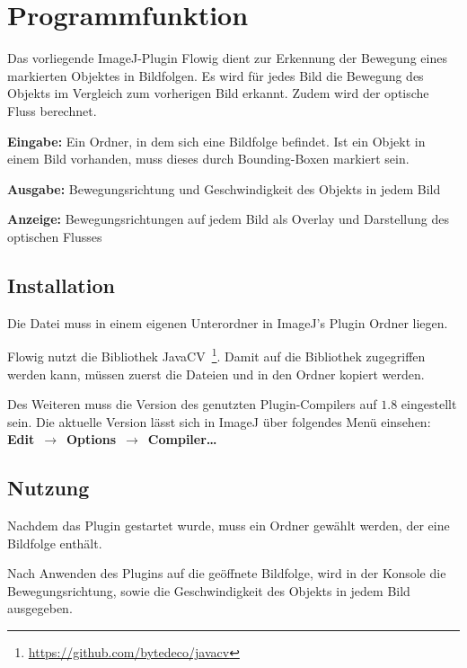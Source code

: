 
\chapter{Programmfunktion}\label{sec:Einleitung}
Das vorliegende ImageJ-Plugin Flowig dient zur Erkennung der Bewegung eines markierten Objektes in Bildfolgen. Es wird für jedes Bild die Bewegung des Objekts im Vergleich zum vorherigen Bild erkannt. Zudem wird der optische Fluss berechnet.

\textbf{Eingabe: } Ein Ordner, in dem sich eine Bildfolge befindet. Ist ein Objekt in einem Bild vorhanden, muss dieses durch Bounding-Boxen markiert sein.


\textbf{Ausgabe: } Bewegungsrichtung und Geschwindigkeit des Objekts in jedem Bild


\textbf{Anzeige: } Bewegungsrichtungen auf jedem Bild als Overlay und Darstellung des optischen Flusses

\section{Installation}
Die Datei  muss in einem eigenen Unterordner  in ImageJ's Plugin Ordner liegen.

Flowig nutzt die Bibliothek JavaCV~\footnote{\url{https://github.com/bytedeco/javacv}}. Damit auf die Bibliothek zugegriffen werden kann, müssen zuerst die Dateien  und  in den Ordner  kopiert werden.

Des Weiteren muss die Version des genutzten Plugin-Compilers auf $1.8$ eingestellt sein. 
Die aktuelle Version lässt sich in ImageJ über folgendes Menü einsehen:\\
\mbox{\textbf{Edit}~$\rightarrow$~\textbf{Options}~$\rightarrow$~\textbf{Compiler\dots}} 

\section{Nutzung}

Nachdem das Plugin gestartet wurde, muss ein Ordner gewählt werden, der eine Bildfolge enthält.

Nach Anwenden des Plugins auf die geöffnete Bildfolge, wird in der Konsole die Bewegungsrichtung, sowie die Geschwindigkeit des Objekts in jedem Bild ausgegeben.

